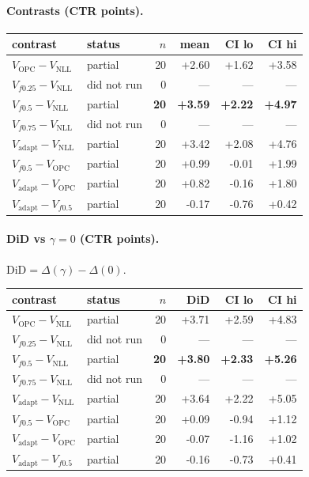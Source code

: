\documentclass[10pt,a4paper]{article}
\begin{document}
\paragraph{Contrasts (CTR points).}
{\centering\small\begin{tabular}{llrrrr}
\toprule contrast & status & $n$ & mean & CI lo & CI hi \\
\midrule
$V_{\mathrm{OPC}}-V_{\mathrm{NLL}}$ & partial & 20 & +2.60 & +1.62 & +3.58 \\
$V_{f0.25}-V_{\mathrm{NLL}}$ & did not run & 0 & --- & --- & --- \\
\textbf{$V_{f0.5}-V_{\mathrm{NLL}}$} & partial & \textbf{20} & \textbf{+3.59} & \textbf{+2.22} & \textbf{+4.97} \\
$V_{f0.75}-V_{\mathrm{NLL}}$ & did not run & 0 & --- & --- & --- \\
$V_{\mathrm{adapt}}-V_{\mathrm{NLL}}$ & partial & 20 & +3.42 & +2.08 & +4.76 \\
$V_{f0.5}-V_{\mathrm{OPC}}$ & partial & 20 & +0.99 & -0.01 & +1.99 \\
$V_{\mathrm{adapt}}-V_{\mathrm{OPC}}$ & partial & 20 & +0.82 & -0.16 & +1.80 \\
$V_{\mathrm{adapt}}-V_{f0.5}$ & partial & 20 & -0.17 & -0.76 & +0.42 \\
\bottomrule\end{tabular}\par}
\paragraph{DiD vs $\gamma=0$ (CTR points).} $\mathrm{DiD}=\Delta(\gamma)-\Delta(0)$.
{\centering\small\begin{tabular}{llrrrr}
\toprule contrast & status & $n$ & DiD & CI lo & CI hi \\
\midrule
$V_{\mathrm{OPC}}-V_{\mathrm{NLL}}$ & partial & 20 & +3.71 & +2.59 & +4.83 \\
$V_{f0.25}-V_{\mathrm{NLL}}$ & did not run & 0 & --- & --- & --- \\
\textbf{$V_{f0.5}-V_{\mathrm{NLL}}$} & partial & \textbf{20} & \textbf{+3.80} & \textbf{+2.33} & \textbf{+5.26} \\
$V_{f0.75}-V_{\mathrm{NLL}}$ & did not run & 0 & --- & --- & --- \\
$V_{\mathrm{adapt}}-V_{\mathrm{NLL}}$ & partial & 20 & +3.64 & +2.22 & +5.05 \\
$V_{f0.5}-V_{\mathrm{OPC}}$ & partial & 20 & +0.09 & -0.94 & +1.12 \\
$V_{\mathrm{adapt}}-V_{\mathrm{OPC}}$ & partial & 20 & -0.07 & -1.16 & +1.02 \\
$V_{\mathrm{adapt}}-V_{f0.5}$ & partial & 20 & -0.16 & -0.73 & +0.41 \\
\bottomrule\end{tabular}\par}
\bigskip
\newpage
\end{document}
